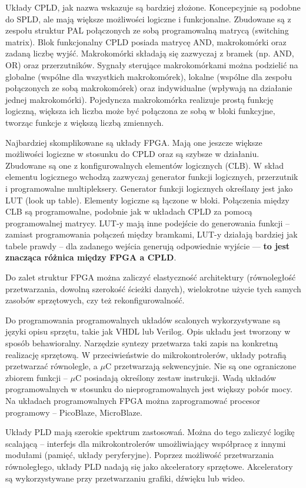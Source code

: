 Układy CPLD, jak nazwa wskazuje są bardziej złożone. Koncepcyjnie są podobne do SPLD, ale mają większe możliwości logiczne i funkcjonalne. Zbudowane są z zespołu struktur PAL połączonych ze sobą programowalną matrycą (switching matrix). Blok funkcjonalny CPLD posiada matrycę AND, makrokomórki oraz zadaną liczbę wyjść. Makrokomórki składają się zazwyczaj z bramek (np. AND, OR) oraz przerzutników. Sygnały sterujące makrokomórkami można podzielić na globalne (wspólne dla wszystkich makrokomórek), lokalne (wspólne dla zespołu połączonych ze sobą makrokomórek) oraz indywidualne (wpływają na działanie jednej makrokomórki). Pojedyncza makrokomórka realizuje prostą funkcję logiczną, większa ich liczba może być połączona ze sobą w bloki funkcyjne, tworząc funkcje z większą liczbą zmiennych. 

Najbardziej skomplikowane są układy FPGA. Mają one jeszcze większe możliwości logiczne w stosunku do CPLD oraz są szybsze w działaniu. Zbudowane są one z konfigurowalnych elementów logicznych (CLB). W skład elementu logicznego wchodzą zazwyczaj generator funkcji logicznych, przerzutnik i programowalne multipleksery. Generator funkcji logicznych określany jest jako LUT (look up table). Elementy logiczne są łączone w bloki. Połączenia między CLB są programowalne, podobnie jak w układach CPLD za pomocą programowalnej matrycy. LUT-y mają inne podejście do generowania funkcji -- zamiast programowania połączeń między bramkami, LUT-y działają bardziej jak tabele prawdy -- dla zadanego wejścia generują odpowiednie wyjście --- \textbf{to jest znacząca różnica między FPGA a CPLD}.

Do zalet struktur FPGA można zaliczyć elastyczność architektury (równoległość przetwarzania, dowolną szerokość ścieżki danych), wielokrotne użycie tych samych zasobów sprzętowych, czy też rekonfigurowalność.

Do programowania programowalnych układów scalonych wykorzystywane są języki opisu sprzętu, takie jak VHDL lub Verilog. Opis układu jest tworzony w sposób behawioralny. Narzędzie syntezy przetwarza taki zapis na konkretną realizację sprzętową. W przeciwieństwie do mikrokontrolerów, układy potrafią przetwarzać równolegle, a $\mu$C przetwarzają sekwencyjnie. Nie są one ograniczone zbiorem funkcji -- $\mu$C posiadają określony zestaw instrukcji. Wadą układów programowalnych w stosunku do nieprogramowalnych jest większy pobór mocy. Na układach programowalnych FPGA można zaprogramować procesor programowy -- PicoBlaze, MicroBlaze.

Układy PLD mają szerokie spektrum zastosowań. Można do tego zaliczyć logikę scalającą -- interfejs dla mikrokontrolerów umożliwiający współpracę z innymi modułami (pamięć, układy peryferyjne). Poprzez możliwość przetwarzania równoległego, układy PLD nadają się jako akceleratory sprzętowe. Akceleratory są wykorzystywane przy przetwarzaniu grafiki, dźwięku lub wideo.